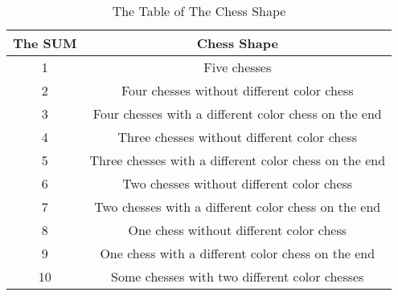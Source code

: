\documentclass[conference,compsoc]{IEEEtran}
\begin{document}
  \begin{table}[!htbp]
    \centering
    \caption{The Table of The Chess Shape}\label{tab:aStrangeTable}
    \begin{tabular}{|c|c|}
      \hline
      \textbf{The SUM} & \textbf{Chess Shape}\\
      \hline
      1 & Five chesses\\
      \hline
      2 & Four chesses without different color chess\\
      \hline
      3 & Four chesses with a different color chess on the end\\
      \hline
      4 & Three chesses without different color chess\\
      \hline
      5 & Three chesses with a different color chess on the end\\
      \hline
      6 & Two chesses without different color chess\\
      \hline
      7 & Two chesses with a different color chess on the end\\
      \hline
      8 & One chess without different color chess\\
      \hline
      9 & One chess with a different color chess on the end\\
      \hline
      10 & Some chesses with two different color chesses\\
      \hline
    \end{tabular}
  \end{table}
\end{document}
